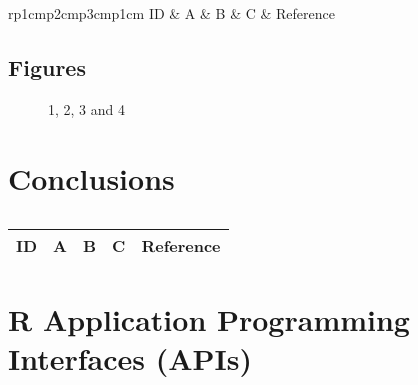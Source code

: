 \centering
\begin{table}[H]\footnotesize
	\caption{}
	\begin{tabular}{rp{1cm}p{2cm}p{3cm}p{1cm}}
		\hline
		ID & A & B & C & Reference \\
		\hline
		\hline
	\end{tabular}
\end{table}
\raggedright


\subsection{Figures}

\begin{figure}[H]
	\centering
	\begin{minipage}[b]{0.5\linewidth}
	\end{minipage}\hfill
	\begin{minipage}[b]{0.5\linewidth}
	\end{minipage}\hfill	
	\begin{minipage}[b]{0.5\linewidth}
	\end{minipage}\hfill
	\begin{minipage}[b]{0.5\linewidth}
	\end{minipage}\hfill
	\caption{1, 2, 3 and 4}
	\label{fig:Figure1}
\end{figure} 

\section{Conclusions}

\centering
\begin{table}[H]\footnotesize
	\caption{}
	\begin{tabular}{rp{1cm}p{2cm}p{3cm}p{1cm}}
		\hline
		ID & A & B & C & Reference \\
		\hline
		\hline
	\end{tabular}
\end{table}
\raggedright


\section{R Application Programming Interfaces (APIs)}




